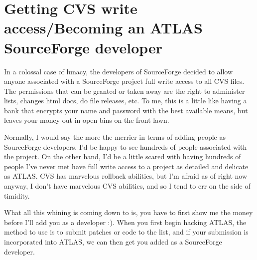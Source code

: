 \documentclass[11pt]{article}
\begin{document}
\section{Getting CVS write access/Becoming an ATLAS SourceForge developer}
In a colossal case of lunacy, the developers of SourceForge decided to allow
anyone associated with a SourceForge project full write access to all CVS 
files.  The permissions that can be granted or taken away are the right to
administer lists, changes html docs, do file releases, etc.  To me, this is
a little like having a bank that encrypts your name and password with the
best available means, but leaves your money out in open bins on the front
lawn.

Normally, I would say the more the merrier in terms of adding people as
SourceForge developers.  I'd be happy to see hundreds of people associated
with the project.  On the other hand, I'd be a little scared with having
hundreds of people I've never met have full write access to a project as
detailed and delicate as ATLAS.  CVS has marvelous rollback abilities, but
I'm afraid as of right now anyway, I don't have marvelous CVS abilities,
and so I tend to err on the side of timidity.

What all this whining is coming down to is, you have to first show me the 
money before I'll add you as a developer :).  When you first begin hacking
ATLAS, the method to use is to submit patches or code to the list,
and if your submission is incorporated into ATLAS, we can then get you
added as a SourceForge developer.
\end{document}
